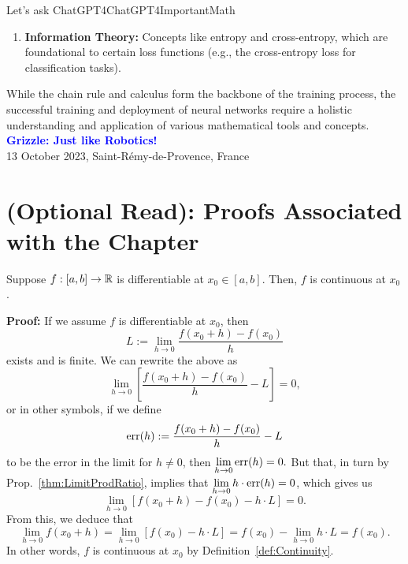 \begin{funColor}{Let's ask ChatGPT4}{ChatGPT4ImportantMath}
\begin{enumerate}
    \item \textbf{Information Theory:} Concepts like entropy and cross-entropy, which are foundational to certain loss functions (e.g., the cross-entropy loss for classification tasks).
\end{enumerate}

While the chain rule and calculus form the backbone of the training process, the successful training and deployment of neural networks require a holistic understanding and application of various mathematical tools and concepts.\\

\textcolor{blue}{\bf Grizzle: Just like Robotics!}\\

\hfill 13 October 2023, Saint-R\'emy-de-Provence, France

\end{funColor}

\section{(Optional Read): Proofs Associated with the Chapter}

 

\begin{tcolorbox}[title=\textcolor{black}{Proof of Prop.~\ref{thm:DifferntiableImpliesContinuous} (Differentiable at $x_0$ Implies Continuous at $x_0$)}, sharp corners, colback=green!30, colframe=green!80!blue, breakable, fonttitle=\bfseries]

Suppose $f:[a, b] \to \mathbb R$ is differentiable at $x_0 \in [a, b]$. Then, $f$ is continuous at $x_0$. 

\end{tcolorbox}

\textbf{Proof:} If we assume $f$ is differentiable at $x_0$, then
$$L:= \lim_{h \to 0} \frac{f(x_0 + h) - f(x_0)}{h} $$
exists and is finite. We can rewrite the above as 
$$\lim_{h \to 0} \left[ \frac{f(x_0 + h) - f(x_0)}{h} - L \right] = 0, $$
or in other symbols, if we define
$$ {\rm err}(h):=  \frac{f(x_0 + h) - f(x_0)}{h} - L $$
to be the error in the limit for $h\neq 0$, then $\displaystyle \lim_{h \to 0} {\rm err}(h) = 0. $ But that, in turn by Prop.~\ref{thm:LimitProdRatio}, implies that 
$\displaystyle \lim_{h \to 0} h \cdot {\rm err}(h) = 0$, which gives us
$$ \lim_{h \to 0} \left[ f(x_0 + h) - f(x_0) - h \cdot L \right] = 0.$$
From this, we deduce that 
$$ \lim_{h \to 0}  f(x_0 + h) = \lim_{h \to 0} \left[ f(x_0) - h \cdot L \right]  =   f(x_0) - \lim_{h \to 0}  h \cdot L  = f(x_0).$$
In other words, $f$ is continuous at $x_0$ by Definition~\ref{def:Continuity}.
\Qed




